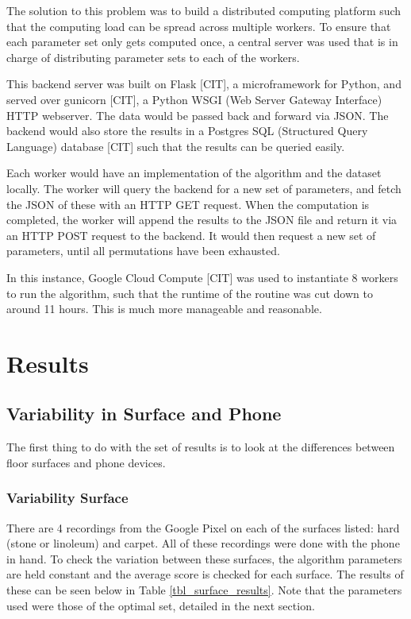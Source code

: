         The solution to this problem was to build a distributed computing platform such that the computing load can be spread across multiple workers. To ensure that each parameter set only gets computed once, a central server was used that is in charge of distributing parameter sets to each of the workers. 

        This backend server was built on Flask [CIT], a microframework for Python, and served over gunicorn [CIT], a Python WSGI (Web Server Gateway Interface) HTTP webserver. The data would be passed back and forward via JSON. The backend would also store the results in a Postgres SQL (Structured Query Language) database [CIT] such that the results can be queried easily.

        Each worker would have an implementation of the algorithm and the dataset locally. The worker will query the backend for a new set of parameters, and fetch the JSON of these with an HTTP GET request. When the computation is completed, the worker will append the results to the JSON file and return it via an HTTP POST request to the backend. It would then request a new set of parameters, until all permutations have been exhausted.

        In this instance, Google Cloud Compute [CIT] was used to instantiate 8 workers to run the algorithm, such that the runtime of the routine was cut down to around 11 hours. This is much more manageable and reasonable.

    \chapter{Results}

        \section{Variability in Surface and Phone}

            The first thing to do with the set of results is to look at the differences between floor surfaces and phone devices. 

            \subsection{Variability Surface}

                There are 4 recordings from the Google Pixel on each of the surfaces listed: hard (stone or linoleum) and carpet. All of these recordings were done with the phone in hand. To check the variation between these surfaces, the algorithm parameters are held constant and the average score is checked for each surface. The results of these can be seen below in Table \ref{tbl_surface_results}. Note that the parameters used were those of the optimal set, detailed in the next section.

